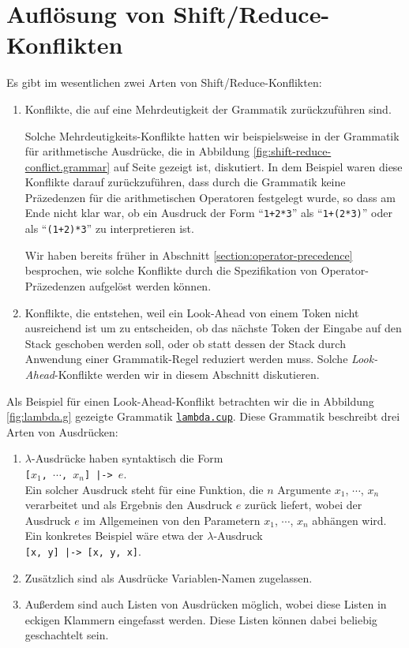 \section{Aufl\"osung von Shift/Reduce-Konflikten}
Es gibt im wesentlichen zwei Arten von Shift/Reduce-Konflikten:
\begin{enumerate}
\item Konflikte, die auf eine Mehrdeutigkeit der Grammatik zur\"uckzuf\"uhren sind.

      Solche Mehrdeutigkeits-Konflikte hatten wir beispielsweise in der Grammatik f\"ur arithmetische
      Ausdr\"ucke, die in Abbildung \ref{fig:shift-reduce-conflict.grammar} auf Seite
      \pageref{fig:shift-reduce-conflict.grammar} gezeigt ist, diskutiert.  In dem Beispiel waren
      diese Konflikte darauf zur\"uckzuf\"uhren, dass durch die Grammatik keine Pr\"azedenzen f\"ur die
      arithmetischen Operatoren festgelegt wurde, so dass am Ende nicht klar war, ob ein Ausdruck
      der Form ``\texttt{1+2*3}'' als ``\texttt{1+(2*3)}'' oder als ``\texttt{(1+2)*3}'' zu
      interpretieren ist.

      Wir haben bereits fr\"uher in Abschnitt \ref{section:operator-precedence} besprochen, wie solche
      Konflikte durch die Spezifikation von Operator-Pr\"azedenzen aufgel\"ost werden k\"onnen.
\item Konflikte, die entstehen, weil ein Look-Ahead von einem Token nicht ausreichend ist um zu
      entscheiden, ob das n\"achste Token der Eingabe auf den Stack geschoben werden soll, oder 
      ob statt dessen der Stack durch Anwendung einer Grammatik-Regel reduziert werden muss.
      Solche \emph{Look-Ahead}-Konflikte   werden wir in diesem Abschnitt diskutieren.
\end{enumerate}
Als Beispiel f\"ur einen Look-Ahead-Konflikt betrachten wir die in Abbildung \ref{fig:lambda.g}
gezeigte Grammatik
\href{https://github.com/karlstroetmann/Formal-Languages/tree/master/Cup/LambdaExpr/lambda.cup}{\texttt{lambda.cup}}.  
Diese Grammatik beschreibt drei Arten von Ausdr\"ucken:
\begin{enumerate}
\item $\lambda$-Ausdr\"ucke haben syntaktisch die Form
      \\[0.2cm]
      \hspace*{1.3cm}
      \texttt{[$x_1$, $\cdots$, $x_n$] |-> $e$}.
      \\[0.2cm]
      Ein solcher Ausdruck steht f\"ur eine Funktion, die $n$ Argumente $x_1$, $\cdots$, $x_n$
      verarbeitet und als Ergebnis den Ausdruck $e$ zur\"uck liefert, wobei der Ausdruck $e$ im
      Allgemeinen von den Parametern $x_1$, $\cdots$, $x_n$ abh\"angen wird.   Ein konkretes Beispiel
      w\"are etwa der $\lambda$-Ausdruck
      \\[0.2cm]
      \hspace*{1.3cm}
      \texttt{[x, y] |-> [x, y, x]}.
\item Zus\"atzlich sind als Ausdr\"ucke Variablen-Namen zugelassen.
\item Au{\ss}erdem sind auch Listen von Ausdr\"ucken m\"oglich, wobei diese Listen in eckigen Klammern
      eingefasst werden.  Diese Listen k\"onnen dabei beliebig geschachtelt sein.
\end{enumerate}

